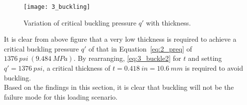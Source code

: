 \begin{figure}[H]
	\centering
	\texttt{[image: 3\_buckling]}
	\caption{Variation of critical buckling pressure $q'$ with thickness.}
	\label{fig:3_buckling}
\end{figure}

It is clear from above figure that a very low thickness is required to achieve a critical buckling pressure $q'$ of that in Equation~\ref{eq:2_preq} of $1376\ psi\ (9.484\ MPa)$. By rearranging, \ref{eq:3_buckle2} for $t$ and setting $q'=1376\ psi$, a critical thickness of $t=0.418\ in= 10.6\ mm$ is required to avoid buckling.\\

Based on the findings in this section, it is clear that buckling will not be the failure mode for this loading scenario.



